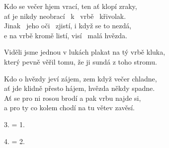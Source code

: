 
\ve{}
Kdo se večer hjem vrací, ten ať klopí zraky,\\
ať je nikdy neobrací \ k \ vrbě \ křivolak. \\
Jinak \ jeho oči \ zjistí, i když se to nezdá,\\
e na vrbě kromě listí, visí \ malá hvězda.

\cho{}
Viděli jsme jednou v lukách plakat na tý vrbě kluka,\\
který pevně věřil tomu, že ji sundá z toho stromu.

\ve{}
Kdo o hvězdy jeví zájem, zem když večer chladne,\\
ať jde klidně přesto hájem, hvězda někdy spadne.\\
Ať se pro ni rosou brodí a pak vrbu najde si,\\
a pro ty co kolem chodí na tu větev zavěsí.

\cho{}

\re{}
3. = 1.

\cho{}

\re{}
4. = 2.

\esong{}